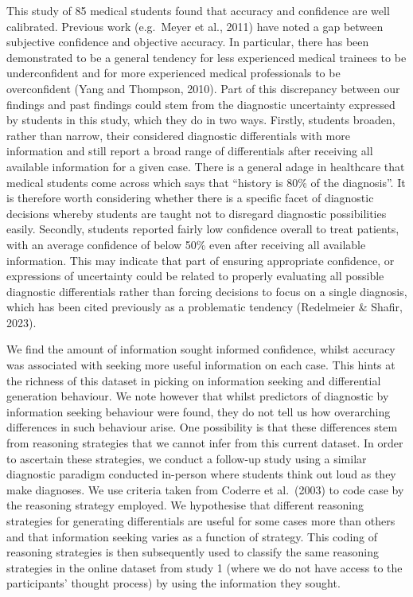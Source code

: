 \documentclass[a4paper, nobind]{templates/ociamthesis}
\begin{document}
This study of 85 medical students found that accuracy and confidence are well calibrated. Previous work (e.g.~Meyer et al., 2011) have noted a gap between subjective confidence and objective accuracy. In particular, there has been demonstrated to be a general tendency for less experienced medical trainees to be underconfident and for more experienced medical professionals to be overconfident (Yang and Thompson, 2010). Part of this discrepancy between our findings and past findings could stem from the diagnostic uncertainty expressed by students in this study, which they do in two ways. Firstly, students broaden, rather than narrow, their considered diagnostic differentials with more information and still report a broad range of differentials after receiving all available information for a given case. There is a general adage in healthcare that medical students come across which says that ``history is 80\% of the diagnosis''. It is therefore worth considering whether there is a specific facet of diagnostic decisions whereby students are taught not to disregard diagnostic possibilities easily. Secondly, students reported fairly low confidence overall to treat patients, with an average confidence of below 50\% even after receiving all available information. This may indicate that part of ensuring appropriate confidence, or expressions of uncertainty could be related to properly evaluating all possible diagnostic differentials rather than forcing decisions to focus on a single diagnosis, which has been cited previously as a problematic tendency (Redelmeier \& Shafir, 2023).

We find the amount of information sought informed confidence, whilst accuracy was associated with seeking more useful information on each case. This hints at the richness of this dataset in picking on information seeking and differential generation behaviour. We note however that whilst predictors of diagnostic by information seeking behaviour were found, they do not tell us how overarching differences in such behaviour arise. One possibility is that these differences stem from reasoning strategies that we cannot infer from this current dataset. In order to ascertain these strategies, we conduct a follow-up study using a similar diagnostic paradigm conducted in-person where students think out loud as they make diagnoses. We use criteria taken from Coderre et al.~(2003) to code case by the reasoning strategy employed. We hypothesise that different reasoning strategies for generating differentials are useful for some cases more than others and that information seeking varies as a function of strategy. This coding of reasoning strategies is then subsequently used to classify the same reasoning strategies in the online dataset from study 1 (where we do not have access to the participants' thought process) by using the information they sought.
\end{document}
